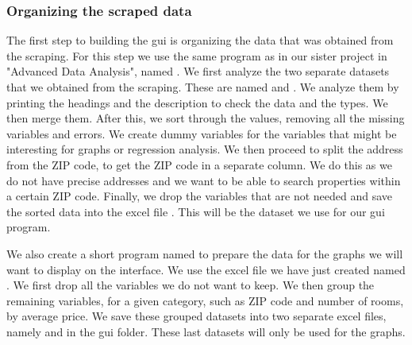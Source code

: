 \documentclass[main]{subfiles}
\begin{document}
\subsubsection{Organizing the scraped data}
The first step to building the \ac{gui} is organizing the data that was obtained from the scraping.
For this step we use the same program as in our sister project in "Advanced Data Analysis", named .
We first analyze the two separate datasets that we obtained from the scraping. 
These are named  and .
We analyze them by printing the headings and the description to check the data and the types.
We then merge them. After this, we sort through the values, removing all the missing variables and errors. 
We create dummy variables for the variables that might be interesting for graphs or regression analysis.
We then proceed to split the address from the ZIP code, to get the ZIP code in a separate column. 
We do this as we do not have precise addresses and we want to be able to search properties within a certain ZIP code. 
Finally, we drop the variables that are not needed and save the sorted data into the excel file .
This will be the dataset we use for our \ac{gui} program. \par
We also create a short program named  to prepare the data for the graphs 
we will want to display on the interface. We use the excel file we have just created named .
We first drop all the variables we do not want to keep. 
We then group the remaining variables, for a given category, such as ZIP code and number of rooms, by average price.
We save these grouped datasets into two separate excel files, namely  and  in the \ac{gui} folder.
These last datasets will only be used for the graphs.\par
\end{document}
